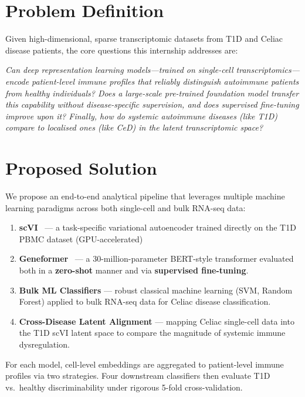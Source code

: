 \section{Problem Definition}

Given high-dimensional, sparse transcriptomic datasets from T1D and Celiac disease patients, the core questions this internship addresses are:

\begin{center}
\textit{Can deep representation learning models---trained on single-cell transcriptomics---encode patient-level immune profiles that reliably distinguish autoimmune patients from healthy individuals? Does a large-scale pre-trained foundation model transfer this capability without disease-specific supervision, and does supervised fine-tuning improve upon it? Finally, how do systemic autoimmune diseases (like T1D) compare to localised ones (like CeD) in the latent transcriptomic space?}
\end{center}

\section{Proposed Solution}

We propose an end-to-end analytical pipeline that leverages multiple machine learning paradigms across both single-cell and bulk RNA-seq data:

\begin{enumerate}
    \item \textbf{scVI}~\cite{lopez2018deep} --- a task-specific variational autoencoder trained directly on the T1D PBMC dataset (GPU-accelerated)
    \item \textbf{Geneformer}~\cite{theodoris2023transfer} --- a 30-million-parameter BERT-style transformer evaluated both in a \textbf{zero-shot} manner and via \textbf{supervised fine-tuning}.
    \item \textbf{Bulk ML Classifiers} --- robust classical machine learning (SVM, Random Forest) applied to bulk RNA-seq data for Celiac disease classification.
    \item \textbf{Cross-Disease Latent Alignment} --- mapping Celiac single-cell data into the T1D scVI latent space to compare the magnitude of systemic immune dysregulation.
\end{enumerate}

For each model, cell-level embeddings are aggregated to patient-level immune profiles via two strategies. Four downstream classifiers then evaluate T1D vs.\ healthy discriminability under rigorous 5-fold cross-validation.

